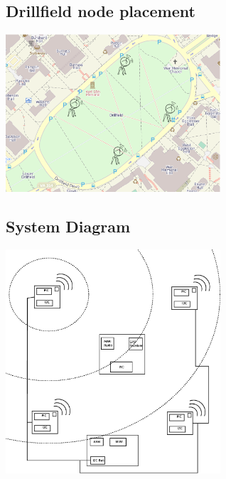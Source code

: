 \documentclass{article}
\begin{document}
\subsection*{Drillfield node placement}
\includegraphics[width=0.6\textwidth]{node_placement}
\subsection*{System Diagram}
\includegraphics[width=0.6\textwidth]{system}
\end{document}
